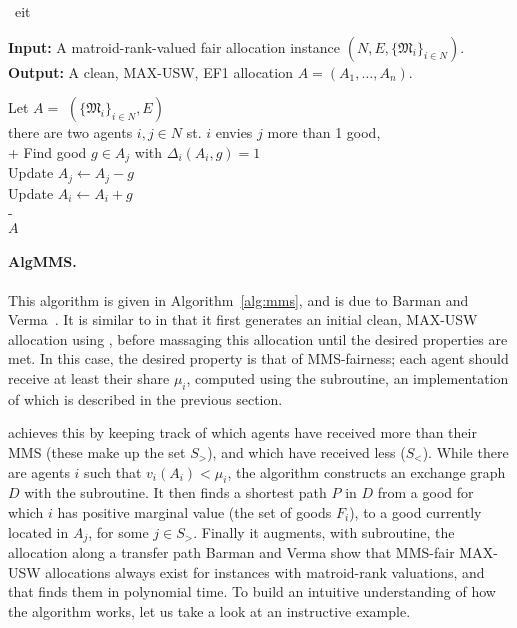 \begin{algorithm}{~\cite{benabbou-2021}}{eit}

\textbf{Input:}  \tab A matroid-rank-valued fair allocation instance $(N, E, \{\mathfrak{M}_i\}_{i\in N})$.\\
\textbf{Output:} \tab A clean, MAX-USW, EF1 allocation $A = (A_1,\dots,A_n)$.

\begin{pseudo}[label=\small\arabic*, indent-mark]
    Let $A =$ $(\{\mathfrak{M}_i\}_{i\in N}, E)$  \\
     there are two agents $i,j\in N$ st. $i$ envies $j$ more than 1 good,   \\+
        Find good $g \in A_j$ with $\Delta_i(A_i, g) = 1$ \\
        Update $A_j \leftarrow A_j - g$ \\
        Update $A_i \leftarrow A_i + g$ \\-
     \\
     $A$
\end{pseudo}
  
\end{algorithm}

\paragraph{AlgMMS.} This algorithm is given in Algorithm~\ref{alg:mms}, and is due to Barman and Verma~\cite{barman2021existence}. It is similar to  in that it first generates an initial clean, MAX-USW allocation using , before massaging this allocation until the desired properties are met. In this case, the desired property is that of MMS-fairness; each agent should receive at least their share $\mu_i$, computed using the  subroutine, an implementation of which is described in the previous section.

 achieves this by keeping track of which agents have received more than their MMS (these make up the set $S_>$), and which have received less ($S_<$). While there are agents $i$ such that $v_i(A_i) < \mu_i$, the algorithm constructs an exchange graph $D$ with the  subroutine. It then finds a shortest path $P$ in $D$ from a good for which $i$ has positive marginal value (the set of goods $F_i$), to a good currently located in $A_j$, for some $j\in S_>$. Finally it augments, with  subroutine, the allocation along a transfer path  Barman and Verma show that MMS-fair MAX-USW allocations always exist for instances with matroid-rank valuations, and that  finds them in polynomial time. To build an intuitive understanding of how the algorithm works, let us take a look at an instructive example.


